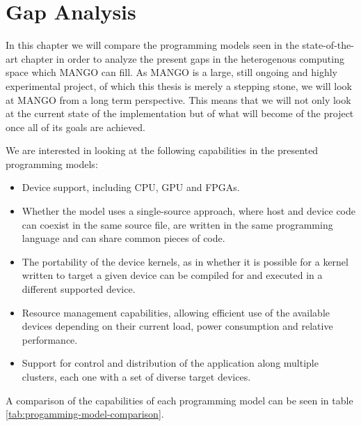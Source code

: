 \chapter{Gap Analysis} \label{ch:GapAnalysis}

In this chapter we will compare the programming models seen in the state-of-the-art chapter in order to analyze the present gaps in the heterogenous computing space which MANGO can fill. As MANGO is a large, still ongoing and highly experimental project, of which this thesis is merely a stepping stone, we will look at MANGO from a long term perspective. This means that we will not only look at the current state of the implementation but of what will become of the project once all of its goals are achieved.

We are interested in looking at the following capabilities in the presented programming models:

\begin{itemize}
    \item Device support, including CPU, GPU and FPGAs.
    \item Whether the model uses a single-source approach, where host and device code can coexist in the same source file, are written in the same programming language and can share common pieces of code.
    \item The portability of the device kernels, as in whether it is possible for a kernel written to target a given device can be compiled for and executed in a different supported device.
    \item Resource management capabilities, allowing efficient use of the available devices depending on their current load, power consumption and relative performance.
    \item Support for control and distribution of the application along multiple clusters, each one with a set of diverse target devices.
\end{itemize}

A comparison of the capabilities of each programming model can be seen in table \ref{tab:progamming-model-comparison}.

